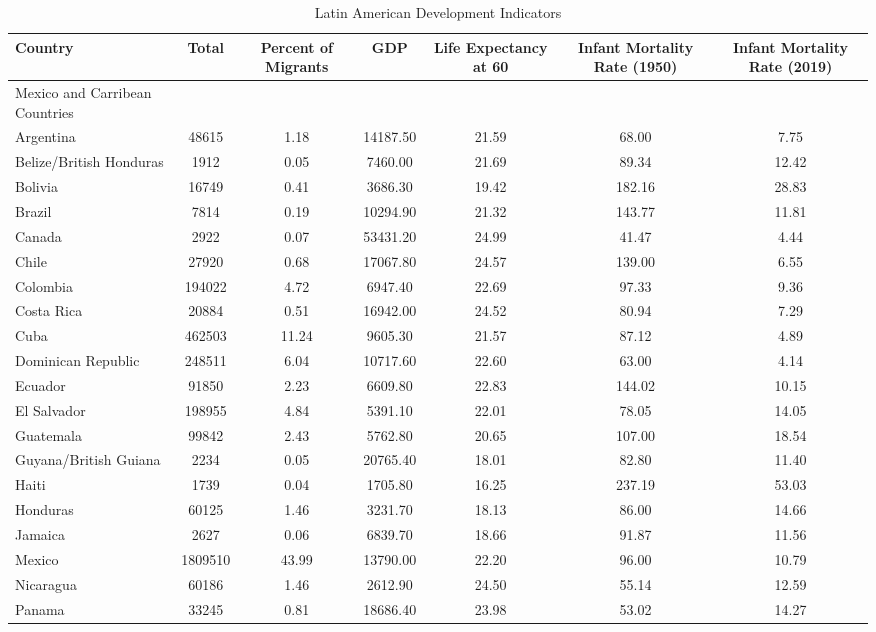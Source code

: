 \begin{table}[ht]
\centering
\caption{Latin American Development Indicators} 
\begin{tabular}{l|cccccc}
  \hline
Country & Total & Percent of Migrants & GDP & Life Expectancy at 60 & Infant Mortality Rate (1950) & Infant Mortality Rate (2019) \\ 
  \hline
Mexico and Carribean Countries &  &  &  &  &  &  \\ 
  Argentina & 48615 & 1.18 & 14187.50 & 21.59 & 68.00 & 7.75 \\ 
  Belize/British Honduras & 1912 & 0.05 & 7460.00 & 21.69 & 89.34 & 12.42 \\ 
  Bolivia & 16749 & 0.41 & 3686.30 & 19.42 & 182.16 & 28.83 \\ 
  Brazil & 7814 & 0.19 & 10294.90 & 21.32 & 143.77 & 11.81 \\ 
  Canada & 2922 & 0.07 & 53431.20 & 24.99 & 41.47 & 4.44 \\ 
  Chile & 27920 & 0.68 & 17067.80 & 24.57 & 139.00 & 6.55 \\ 
  Colombia & 194022 & 4.72 & 6947.40 & 22.69 & 97.33 & 9.36 \\ 
  Costa Rica & 20884 & 0.51 & 16942.00 & 24.52 & 80.94 & 7.29 \\ 
  Cuba & 462503 & 11.24 & 9605.30 & 21.57 & 87.12 & 4.89 \\ 
  Dominican Republic & 248511 & 6.04 & 10717.60 & 22.60 & 63.00 & 4.14 \\ 
  Ecuador & 91850 & 2.23 & 6609.80 & 22.83 & 144.02 & 10.15 \\ 
  El Salvador & 198955 & 4.84 & 5391.10 & 22.01 & 78.05 & 14.05 \\ 
  Guatemala & 99842 & 2.43 & 5762.80 & 20.65 & 107.00 & 18.54 \\ 
  Guyana/British Guiana & 2234 & 0.05 & 20765.40 & 18.01 & 82.80 & 11.40 \\ 
  Haiti & 1739 & 0.04 & 1705.80 & 16.25 & 237.19 & 53.03 \\ 
  Honduras & 60125 & 1.46 & 3231.70 & 18.13 & 86.00 & 14.66 \\ 
  Jamaica & 2627 & 0.06 & 6839.70 & 18.66 & 91.87 & 11.56 \\ 
  Mexico & 1809510 & 43.99 & 13790.00 & 22.20 & 96.00 & 10.79 \\ 
  Nicaragua & 60186 & 1.46 & 2612.90 & 24.50 & 55.14 & 12.59 \\ 
  Panama & 33245 & 0.81 & 18686.40 & 23.98 & 53.02 & 14.27 \\ 

\end{tabular}
\end{table}
